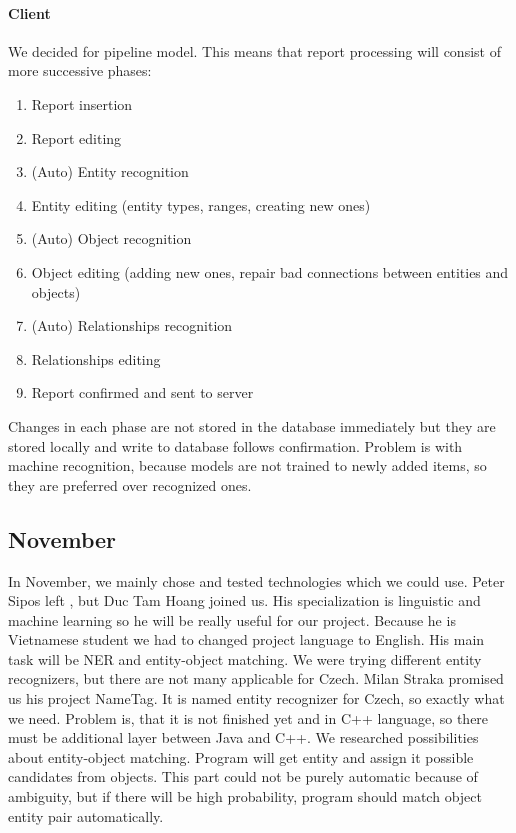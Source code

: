 \paragraph{Client}
We decided for pipeline model. This means that report processing will consist of more successive phases:

\begin{enumerate}
\item Report insertion
\item Report editing
\item (Auto) Entity recognition
\item Entity editing (entity types, ranges, creating new ones)
\item (Auto) Object recognition
\item Object editing (adding new ones, repair bad connections between entities and objects)
\item (Auto) Relationships recognition
\item Relationships editing
\item Report confirmed and sent to server
\end{enumerate}

Changes in each phase are not stored in the database immediately but they are
stored locally and write to database follows confirmation. Problem is with
machine recognition, because models are not trained to newly added items, so
they are preferred over recognized ones.
 
\subsection{November}
In November, we mainly chose and tested technologies which we could use. Peter
Sipos left \textan{}, but Duc Tam Hoang joined us. His specialization is
linguistic and machine learning so he will be really useful for our project.
Because he is Vietnamese student we had to changed project language to English.
His main task will be NER and entity-object matching. We were trying different
entity recognizers, but there are not many applicable for Czech. Milan Straka
promised us his project NameTag. It is named entity recognizer for Czech, so
exactly what we need. Problem is, that it is not finished yet and in C++
language, so there must be additional layer between Java and C++.
We researched possibilities about entity-object matching. Program will get
entity and assign it possible candidates from objects. This part could not be
purely automatic because of ambiguity, but if there will be high probability,
program should match object entity pair automatically.

